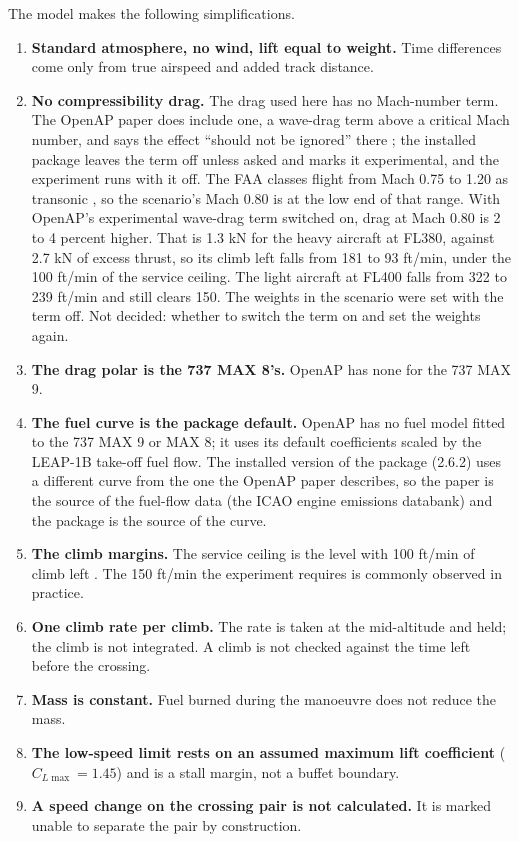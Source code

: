 The model makes the following simplifications.
\begin{enumerate}
\item \textbf{Standard atmosphere, no wind, lift equal to weight.} Time differences come only from true airspeed and added track distance.
\item \textbf{No compressibility drag.} The drag used here has no Mach-number term. The OpenAP paper does include one, a wave-drag term above a critical Mach number, and says the effect ``should not be ignored'' there \cite{sun2020openap}; the installed package leaves the term off unless asked and marks it experimental, and the experiment runs with it off. The FAA classes flight from Mach 0.75 to 1.20 as transonic \cite{faa2015ac61107b}, so the scenario's Mach 0.80 is at the low end of that range. With OpenAP's experimental wave-drag term switched on, drag at Mach 0.80 is 2 to 4 percent higher. That is 1.3 kN for the heavy aircraft at FL380, against 2.7 kN of excess thrust, so its climb left falls from 181 to 93 ft/min, under the 100 ft/min of the service ceiling. The light aircraft at FL400 falls from 322 to 239 ft/min and still clears 150. The weights in the scenario were set with the term off. Not decided: whether to switch the term on and set the weights again.
\item \textbf{The drag polar is the 737 MAX 8's.} OpenAP has none for the 737 MAX 9.
\item \textbf{The fuel curve is the package default.} OpenAP has no fuel model fitted to the 737 MAX 9 or MAX 8; it uses its default coefficients scaled by the LEAP-1B take-off fuel flow. The installed version of the package (2.6.2) uses a different curve from the one the OpenAP paper describes, so the paper is the source of the fuel-flow data (the ICAO engine emissions databank) and the package is the source of the curve.
\item \textbf{The climb margins.} The service ceiling is the level with 100 ft/min of climb left \cite{faa2015ac61107b}. The 150 ft/min the experiment requires is commonly observed in practice.
\item \textbf{One climb rate per climb.} The rate is taken at the mid-altitude and held; the climb is not integrated. A climb is not checked against the time left before the crossing.
\item \textbf{Mass is constant.} Fuel burned during the manoeuvre does not reduce the mass.
\item \textbf{The low-speed limit rests on an assumed maximum lift coefficient} ($C_{L\max} = 1.45$) and is a stall margin, not a buffet boundary.
\item \textbf{A speed change on the crossing pair is not calculated.} It is marked unable to separate the pair by construction.
\end{enumerate}

